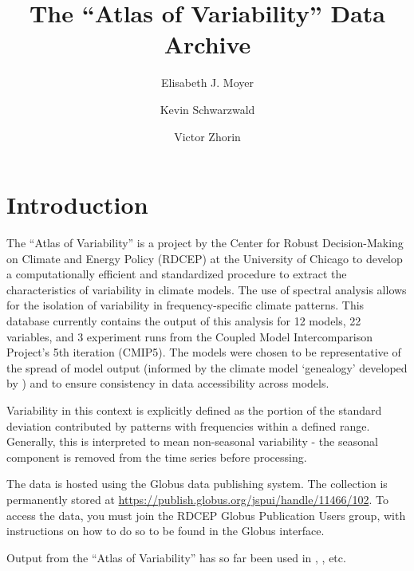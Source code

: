 \documentclass[11pt]{amsart}
\title{The ``Atlas of Variability'' Data Archive}
\author{Elisabeth J. Moyer}
\author{Kevin Schwarzwald}
\author{Victor Zhorin}
\begin{document}
\sloppy
\maketitle
\section{Introduction}
The ``Atlas of Variability'' is a project by the Center for Robust Decision-Making on Climate and Energy Policy (RDCEP) at the University of Chicago to develop a computationally efficient and standardized procedure to extract the characteristics of variability in climate models. The use of spectral analysis allows for the isolation of variability in frequency-specific climate patterns. This database currently contains the output of this analysis for 12 models, 22 variables, and 3 experiment runs from the Coupled Model Intercomparison Project's 5th iteration (CMIP5). The models were chosen to be representative of the spread of model output (informed by the climate model `genealogy' developed by \cite{knutti_climate_2013}) and to ensure consistency in data accessibility across models.

Variability in this context is explicitly defined as the portion of the standard deviation contributed by patterns with frequencies within a defined range. Generally, this is interpreted to mean non-seasonal variability - the seasonal component is removed from the time series before processing. 

The data is hosted using the Globus data publishing system. The collection is permanently stored at \url{https://publish.globus.org/jspui/handle/11466/102}. To access the data, you must join the RDCEP Globus Publication Users group, with instructions on how to do so to be found in the Globus interface. 

Output from the ``Atlas of Variability'' has so far been used in \cite{moyer_2017_changes}, \cite{schwarzwald_2017_temperature}, etc.
\end{document}
